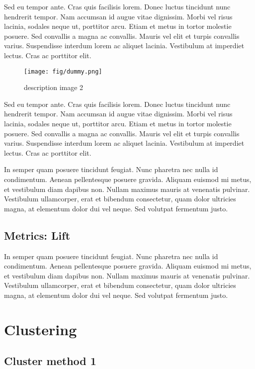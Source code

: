 Sed eu tempor ante. Cras quis facilisis lorem. Donec luctus tincidunt nunc hendrerit tempor. Nam accumsan id augue vitae dignissim. Morbi vel risus lacinia, sodales neque ut, porttitor arcu. Etiam et metus in tortor molestie posuere. Sed convallis a magna ac convallis. Mauris vel elit et turpis convallis varius. Suspendisse interdum lorem ac aliquet lacinia. Vestibulum at imperdiet lectus. Cras ac porttitor elit. 

\begin{figure}
       \centering
       \texttt{[image: fig/dummy.png]}
       \caption{description image 2}
       \label{image2}
\end{figure}

Sed eu tempor ante. Cras quis facilisis lorem. Donec luctus tincidunt nunc hendrerit tempor. Nam accumsan id augue vitae dignissim. Morbi vel risus lacinia, sodales neque ut, porttitor arcu. Etiam et metus in tortor molestie posuere. Sed convallis a magna ac convallis. Mauris vel elit et turpis convallis varius. Suspendisse interdum lorem ac aliquet lacinia. Vestibulum at imperdiet lectus. Cras ac porttitor elit.

In semper quam posuere tincidunt feugiat. Nunc pharetra nec nulla id condimentum. Aenean pellentesque posuere gravida. Aliquam euismod mi metus, et vestibulum diam dapibus non. Nullam maximus mauris at venenatis pulvinar. Vestibulum ullamcorper, erat et bibendum consectetur, quam dolor ultricies magna, at elementum dolor dui vel neque. Sed volutpat fermentum justo. 


\subsection{Metrics: Lift}

In semper quam posuere tincidunt feugiat. Nunc pharetra nec nulla id condimentum. Aenean pellentesque posuere gravida. Aliquam euismod mi metus, et vestibulum diam dapibus non. Nullam maximus mauris at venenatis pulvinar. Vestibulum ullamcorper, erat et bibendum consectetur, quam dolor ultricies magna, at elementum dolor dui vel neque. Sed volutpat fermentum justo. 

\section{Clustering}

\subsection{Cluster method 1}

